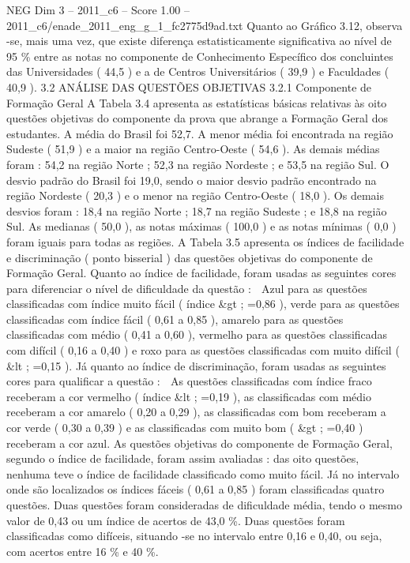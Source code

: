 \begin{textsample}{NEG Dim 3 – 2011\_c6 – Score 1.00 – 2011\_c6/enade\_2011\_eng\_g\_1\_fc2775d9ad.txt}
Quanto ao Gráfico 3.12, observa -se, mais uma vez, que existe diferença estatisticamente significativa ao nível de 95 \% entre as notas no componente de Conhecimento Específico dos concluintes das Universidades ( 44,5 ) e a de Centros Universitários ( 39,9 ) e Faculdades ( 40,9 ). 3.2 ANÁLISE DAS QUESTÕES OBJETIVAS 3.2.1 Componente de Formação Geral A Tabela 3.4 apresenta as estatísticas básicas relativas às oito questões objetivas do componente da prova que abrange a Formação Geral dos estudantes.
A média do Brasil foi 52,7.
A menor média foi encontrada na região Sudeste ( 51,9 ) e a maior na região Centro-Oeste ( 54,6 ).
As demais médias foram : 54,2 na região Norte ; 52,3 na região Nordeste ; e 53,5 na região Sul.
O desvio padrão do Brasil foi 19,0, sendo o maior desvio padrão encontrado na região Nordeste ( 20,3 ) e o menor na região Centro-Oeste ( 18,0 ).
Os demais desvios foram : 18,4 na região Norte ; 18,7 na região Sudeste ; e 18,8 na região Sul.
As medianas ( 50,0 ), as notas máximas ( 100,0 ) e as notas mínimas ( 0,0 ) foram iguais para todas as regiões.
A Tabela 3.5 apresenta os índices de facilidade e discriminação ( ponto bisserial ) das questões objetivas do componente de Formação Geral.
Quanto ao índice de facilidade, foram usadas as seguintes cores para diferenciar o nível de dificuldade da questão :  Azul para as questões classificadas com índice muito fácil ( índice \&gt ; =0,86 ), verde para as questões classificadas com índice fácil ( 0,61 a 0,85 ), amarelo para as questões classificadas com médio ( 0,41 a 0,60 ), vermelho para as questões classificadas com difícil ( 0,16 a 0,40 ) e roxo para as questões classificadas com muito difícil ( \&lt ; =0,15 ).
Já quanto ao índice de discriminação, foram usadas as seguintes cores para qualificar a questão :  As questões classificadas com índice fraco receberam a cor vermelho ( índice \&lt ; =0,19 ), as classificadas com médio receberam a cor amarelo ( 0,20 a 0,29 ), as classificadas com bom receberam a cor verde ( 0,30 a 0,39 ) e as classificadas com muito bom ( \&gt ; =0,40 ) receberam a cor azul.
As questões objetivas do componente de Formação Geral, segundo o índice de facilidade, foram assim avaliadas : das oito questões, nenhuma teve o índice de facilidade classificado como muito fácil.
Já no intervalo onde são localizados os índices fáceis ( 0,61 a 0,85 ) foram classificadas quatro questões.
Duas questões foram consideradas de dificuldade média, tendo o mesmo valor de 0,43 ou um índice de acertos de 43,0 \%.
Duas questões foram classificadas como difíceis, situando -se no intervalo entre 0,16 e 0,40, ou seja, com acertos entre 16 \% e 40 \%.

\end{textsample}
